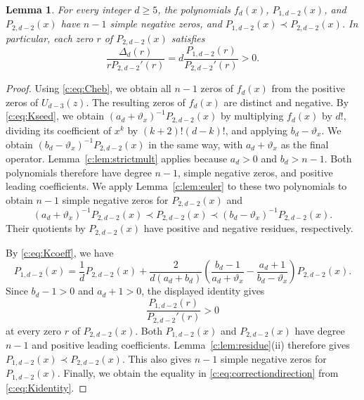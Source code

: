 \documentclass[10pt,a4paper]{article}
\numberwithin{equation}{section}
\newtheorem{lemma}[theorem]{Lemma}
\theoremstyle{remark}\newtheorem{remark}[theorem]{Remark}
\newcommand{\varthetax}{\vartheta_x}
\begin{document}
\begin{lemma}\label{c:lem:comparisonzeros}
For every integer $d\ge5$, the polynomials $f_d(x)$, $P_{1,d-2}(x)$, and $P_{2,d-2}(x)$
have $n-1$ simple negative zeros, and $P_{1,d-2}(x)\prec P_{2,d-2}(x)$.
In particular, each zero $r$ of $P_{2,d-2}(x)$ satisfies
\begin{equation}\label{c:eq:correctiondirection}
 \frac{\Delta_d(r)}{rP_{2,d-2}'(r)}=d\frac{P_{1,d-2}(r)}{P_{2,d-2}'(r)}>0.
\end{equation}
\end{lemma}
\begin{proof}
Using \eqref{c:eq:Cheb}, we obtain all $n-1$ zeros of $f_d(x)$ from
the positive zeros of $U_{d-3}(z)$. The resulting zeros of $f_d(x)$
are distinct and negative.
By \eqref{c:eq:Kseed}, we obtain
$(a_d+\varthetax)^{-1}P_{2,d-2}(x)$ by multiplying $f_d(x)$ by $d!$,
dividing its coefficient of $x^k$ by $(k+2)!(d-k)!$, and applying
$b_d-\varthetax$. We obtain $(b_d-\varthetax)^{-1}P_{2,d-2}(x)$ in
the same way, with $a_d+\varthetax$ as the final operator.
Lemma~\ref{c:lem:strictmult} applies because $a_d>0$ and $b_d>n-1$.
Both polynomials therefore have degree $n-1$, simple negative zeros,
and positive leading coefficients.
We apply Lemma~\ref{c:lem:euler} to these two polynomials to obtain
$n-1$ simple negative zeros for $P_{2,d-2}(x)$ and
\[
 (a_d+\varthetax)^{-1}P_{2,d-2}(x)\prec P_{2,d-2}(x)
 \prec(b_d-\varthetax)^{-1}P_{2,d-2}(x).
\]
Their quotients by $P_{2,d-2}(x)$ have positive and negative residues,
respectively.

By \eqref{c:eq:Kcoeff}, we have
\[
 P_{1,d-2}(x)=\frac1dP_{2,d-2}(x)+\frac{2}{d(a_d+b_d)}
 \left(\frac{b_d-1}{a_d+\varthetax}
       -\frac{a_d+1}{b_d-\varthetax}\right)P_{2,d-2}(x).
\]
Since $b_d-1>0$ and $a_d+1>0$, the displayed identity gives
\[
 \frac{P_{1,d-2}(r)}{P_{2,d-2}'(r)}>0
\]
at every zero $r$ of $P_{2,d-2}(x)$.
Both $P_{1,d-2}(x)$ and $P_{2,d-2}(x)$ have degree $n-1$ and positive
leading coefficients. Lemma~\ref{c:lem:residue}(ii) therefore gives
$P_{1,d-2}(x)\prec P_{2,d-2}(x)$.
This also gives $n-1$ simple negative zeros for $P_{1,d-2}(x)$.
Finally, we obtain the equality in \eqref{c:eq:correctiondirection}
from \eqref{c:eq:Kidentity}.
\end{proof}
\end{document}
